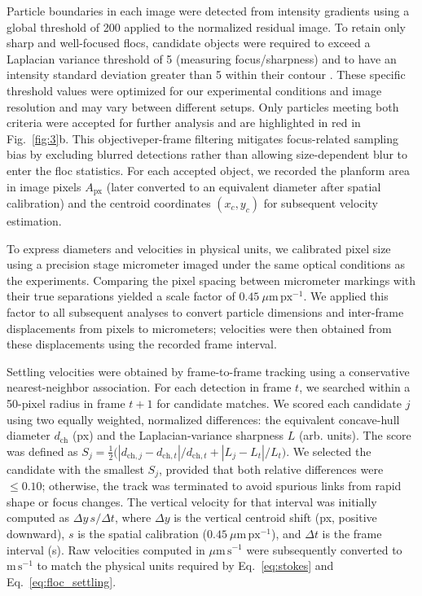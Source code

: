 \documentclass{agujournal2019}
\providecommand{\DIFadd}[1]{{\protect\color{blue} #1}} %
\providecommand{\DIFdel}[1]{{\protect\color{red}\sout{#1}}} %
\providecommand{\DIFaddbegin}{\protect\color{blue}} %
\providecommand{\DIFaddend}{\protect\color{black}} %
\providecommand{\DIFdelbegin}{\protect\color{red}} %
\providecommand{\DIFdelend}{\protect\color{black}} %
\newcommand{\DIFscaledelfig}{0.5}
\newlength{\DIFdelgraphicswidth} %
\newlength{\DIFdelgraphicsheight} %
\newcommand{\DIFaddincludegraphics}[2][]{{\color{blue}\fbox{\DIFOincludegraphics[#1]{#2}}}} %
\newcommand{\DIFdelincludegraphics}[2][]{%
\sbox{\DIFdelgraphicsbox}{\DIFOincludegraphics[#1]{#2}}%
\settoboxwidth{\DIFdelgraphicswidth}{\DIFdelgraphicsbox} %
\settoboxtotalheight{\DIFdelgraphicsheight}{\DIFdelgraphicsbox} %
\scalebox{\DIFscaledelfig}{%
\parbox[b]{\DIFdelgraphicswidth}{\usebox{\DIFdelgraphicsbox}\\[-\baselineskip] \rule{\DIFdelgraphicswidth}{0em}}\llap{\resizebox{\DIFdelgraphicswidth}{\DIFdelgraphicsheight}{%
\setlength{\unitlength}{\DIFdelgraphicswidth}%
\begin{picture}(1,1)%
\thicklines\linethickness{2pt} %
{\color[rgb]{1,0,0}\put(0,0){\framebox(1,1){}}}%
{\color[rgb]{1,0,0}\put(0,0){\line( 1,1){1}}}%
{\color[rgb]{1,0,0}\put(0,1){\line(1,-1){1}}}%
\end{picture}%
}\hspace*{3pt}}} %
} %
\DeclareRobustCommand{\DIFaddbegin}{\DIFOaddbegin \let\includegraphics\DIFaddincludegraphics} %
\DeclareRobustCommand{\DIFaddend}{\DIFOaddend \let\includegraphics\DIFOincludegraphics} %
\DeclareRobustCommand{\DIFdelbegin}{\DIFOdelbegin \let\includegraphics\DIFdelincludegraphics} %
\DeclareRobustCommand{\DIFdelend}{\DIFOaddend \let\includegraphics\DIFOincludegraphics} %
\begin{document}
Particle boundaries in each image were detected from intensity gradients using a global threshold of 200 applied to the normalized residual image. To retain only sharp and well-focused flocs, candidate objects were required to exceed a Laplacian variance threshold of 5 (measuring focus/sharpness) and to have an intensity standard deviation greater than 5 within their contour \cite{pertuz2013analysis}. These specific threshold values were optimized for our experimental conditions and image resolution \DIFdelbegin \DIFdel{, }\DIFdelend and may vary between different setups. Only particles meeting both criteria were accepted for further analysis and are highlighted in red in Fig.~\ref{fig:3}b. This objective\DIFaddbegin \DIFadd{, }\DIFaddend per-frame filtering mitigates focus-related sampling bias by excluding blurred detections rather than allowing size-dependent blur to enter the floc statistics. For each accepted object, we recorded the planform area in image pixels $A_{\mathrm{px}}$ (later converted to an equivalent diameter after spatial calibration) and the centroid coordinates $(x_c,y_c)$ \DIFaddbegin \DIFadd{(}\DIFaddend for subsequent velocity estimation\DIFaddbegin \DIFadd{)}\DIFaddend .

To express diameters and velocities in physical units, we calibrated pixel size using a precision stage micrometer imaged under the same optical conditions as the experiments. Comparing the pixel spacing between micrometer markings with their true separations yielded a scale factor of \(0.45~\mu\mathrm{m\,px^{-1}}\). We applied this factor to all subsequent analyses to convert particle dimensions and inter-frame displacements from pixels to micrometers; velocities were then obtained from these displacements using the recorded frame interval.

Settling velocities were obtained by frame-to-frame tracking using a conservative nearest-neighbor association. For each detection in frame \(t\), we searched within a 50-pixel radius in frame \(t{+}1\) for candidate matches. We scored each candidate \(j\) using two equally weighted, normalized differences: the equivalent concave-hull diameter \(d_{\mathrm{ch}}\) (px) and the Laplacian-variance sharpness \(L\) (arb. units). The score was defined as \(S_j=\tfrac{1}{2}\big(|d_{\mathrm{ch},j}-d_{\mathrm{ch},t}|/d_{\mathrm{ch},t}+|L_j-L_t|/L_t\big)\). We selected the candidate with the smallest \(S_j\), provided that both relative differences were \(\le 0.10\); otherwise, the track was terminated to avoid spurious links from rapid shape or focus changes. The vertical velocity for that interval was initially computed as \(\Delta y\,s/\Delta t\), where \(\Delta y\) is the vertical centroid shift (px, positive downward), \(s\) is the spatial calibration (\(0.45~\mu\mathrm{m\,px^{-1}}\)), and \(\Delta t\) is the frame interval (s). Raw velocities computed in \(\mu\mathrm{m\,s^{-1}}\) were subsequently converted to \(\mathrm{m\,s^{-1}}\) to match the physical units required by Eq.~\eqref{eq:stokes} and Eq.~\eqref{eq:floc_settling}.
\end{document}
